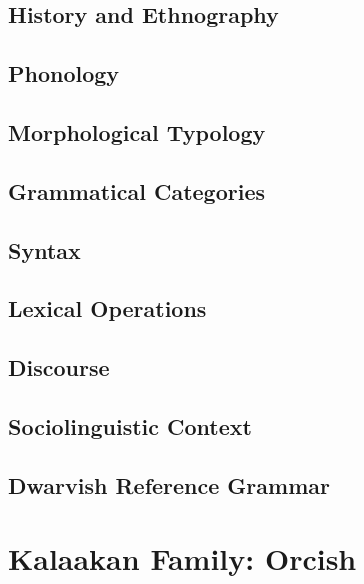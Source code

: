 \documentclass[12pt,letterpaper,openany,twoside]{memoir}
\let\originalpart=\part
\def\part{\cleardoublepage\originalpart}
\begin{document}
\chapter{History and Ethnography}

\chapter{Phonology}

\chapter{Morphological Typology}

\chapter{Grammatical Categories}

\chapter{Syntax}

\chapter{Lexical Operations}

\chapter{Discourse}

\chapter{Sociolinguistic Context}

\chapter{Dwarvish Reference Grammar}

\part{Kalaakan Family: Orcish}
\end{document}
